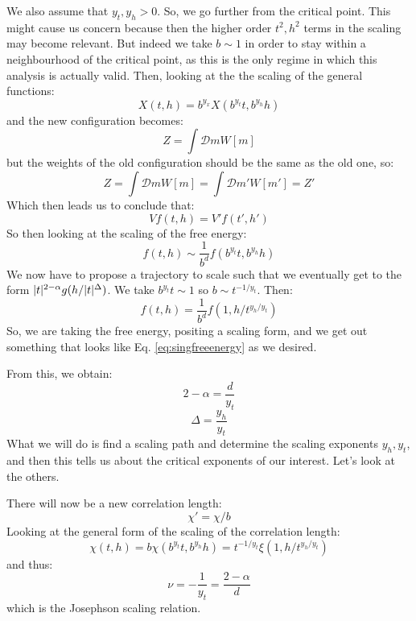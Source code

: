 We also assume that $y_t, y_h > 0$. So, we go further from the critical point. This might cause us concern because then the higher order $t^2, h^2$ terms in the scaling may become relevant. But indeed we take $b \sim 1$ in order to stay within a neighbourhood of the critical point, as this is the only regime in which this analysis is actually valid. Then, looking at the the scaling of the general functions:
\begin{equation}
    X(t, h) = b^{y_x}X(b^{y_t}t, b^{y_h}h)
\end{equation}
and the new configuration becomes:
\begin{equation}
    Z = \int \mathcal{D}mW[m]
\end{equation}
but the weights of the old configuration should be the same as the old one, so:
\begin{equation}
    Z = \int \mathcal{D}mW[m] = \int \mathcal{D}m' W[m'] = Z'
\end{equation}
Which then leads us to conclude that:
\begin{equation}
    Vf(t, h) = V'f(t',h')
\end{equation}
So then looking at the scaling of the free energy:
\begin{equation}
    f(t, h) \sim \frac{1}{b^d}f(b^{y_t}t, b^{y_h}h)
\end{equation}
We now have to propose a trajectory to scale such that we eventually get to the form $\lvert t \rvert^{2-\alpha}g(h/\lvert t \rvert^\Delta)$. We take $b^{y_t}t \sim 1$ so $b\sim t^{-1/y_t}$. Then:
\begin{equation}
    f(t, h) = \frac{1}{b^d}f(1, h/t^{y_h/y_t})
\end{equation}
So, we are taking the free energy, positing a scaling form, and we get out something that looks like Eq. \eqref{eq:singfreeenergy} as we desired.

From this, we obtain:
\begin{equation}
    2 - \alpha = \frac{d}{y_t}
\end{equation}
\begin{equation}
    \Delta = \frac{y_h}{y_t}
\end{equation}
What we will do is find a scaling path and determine the scaling exponents $y_h, y_t$, and then this tells us about the critical exponents of our interest. Let's look at the others.

There will now be a new correlation length:
\begin{equation}
    \chi' = \chi/b
\end{equation}
Looking at the general form of the scaling of the correlation length:
\begin{equation}
    \chi(t, h)= b\chi(b^{y_t}t, b^{y_h}h) = t^{-1/y_t}\xi(1, h/t^{y_h/y_t}) 
\end{equation}
and thus:
\begin{equation}
    \nu = -\frac{1}{y_t} = \frac{2-\alpha}{d}
\end{equation}
which is the Josephson scaling relation.

